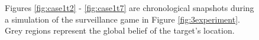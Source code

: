 \begin{figure}
\begin{minipage}{5.0cm}
{		}
		
	\end{minipage}
	
	
	\caption{Figures \ref{fig:case1t2} - \ref{fig:case1t7} are chronological snapshots during a simulation of the surveillance game in Figure \ref{fig:3experiment}. Grey regions represent the global belief of the target's location.  
	}\vspace{-0.5cm}
	\label{fig:case1exp}
	
\end{figure}

